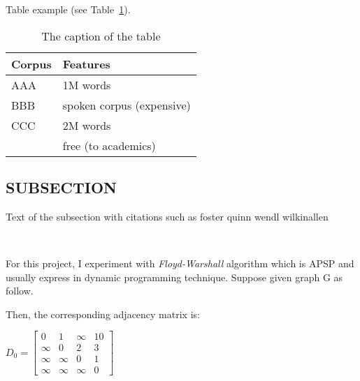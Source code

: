 \documentclass[dareport.tex]{subfiles}
\begin{document}
Table example (see Table~\ref{eg_tbl}).

\begin{table}[h]
 \begin{center}
\begin{tabular}{|l|l|}

      \hline
      Corpus & Features\\
      \hline\hline
      AAA & 1M words\\
      BBB & spoken corpus (expensive)\\
      CCC & 2M words\\
        & free (to academics)\\
      \hline

\end{tabular}
\caption{The caption of the table}\label{eg_tbl}
 \end{center}
\end{table}


\subsection{SUBSECTION}

Text of the subsection with citations such as foster\cite{foster} quinn\cite{quinn} wendl\cite{wendl} wilkinallen\cite{wilkinallen}

\
\

For this project, I experiment with \emph{Floyd-Warshall} algorithm which is APSP and usually express in dynamic programming technique. Suppose given graph G as follow.

\begin{center}
\end{center}

Then, the corresponding adjacency matrix is:

\begin{center}
$D_{0} = \begin{bmatrix}
        0 & 1 & \infty & 10 \\
       	\infty & 0 & 2 & 3 \\
       	\infty & \infty & 0 & 1 \\
       	\infty & \infty & \infty & 0
       	\end{bmatrix}$

\end{center}
\end{document}
